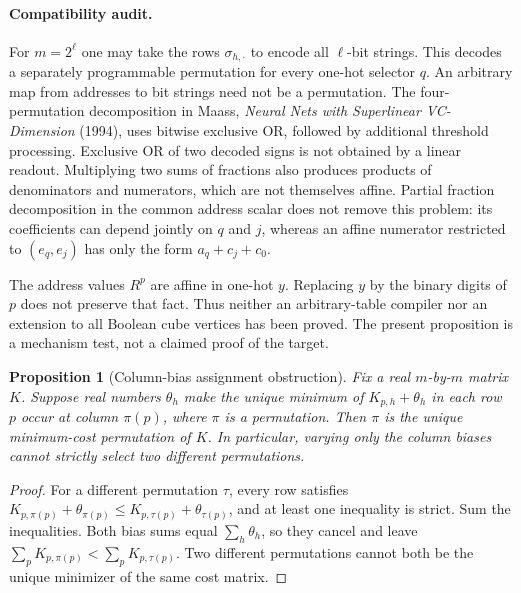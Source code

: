 \documentclass[11pt]{article}
\newtheorem{proposition}{Proposition}
\begin{document}
\paragraph{Compatibility audit.}
For $m=2^{\ell}$ one may take the rows $\sigma_{h,\cdot}$ to encode
all $\ell$-bit strings. This decodes a separately programmable
permutation for every one-hot selector $q$. An arbitrary map from
addresses to bit strings need not be a permutation. The four-permutation
decomposition in Maass, \emph{Neural Nets with Superlinear VC-Dimension}
(1994), uses bitwise exclusive OR, followed by additional threshold
processing. Exclusive OR of two decoded signs is not obtained by a
linear readout. Multiplying two sums of fractions also produces products
of denominators and numerators, which are not themselves affine.
Partial fraction decomposition in the common address scalar does not
remove this problem: its coefficients can depend jointly on $q$ and
$j$, whereas an affine numerator restricted to $(e_q,e_j)$ has only
the form $a_q+c_j+c_0$.

The address values $R^p$ are affine in one-hot $y$. Replacing $y$ by
the binary digits of $p$ does not preserve that fact. Thus neither an
arbitrary-table compiler nor an extension to all Boolean cube vertices
has been proved. The present proposition is a mechanism test, not a
claimed proof of the target.

\begin{proposition}[Column-bias assignment obstruction]
Fix a real $m$-by-$m$ matrix $K$. Suppose real numbers $\theta_h$
make the unique minimum of $K_{p,h}+\theta_h$ in each row $p$ occur
at column $\pi(p)$, where $\pi$ is a permutation. Then $\pi$ is the
unique minimum-cost permutation of $K$. In particular, varying only
the column biases cannot strictly select two different permutations.
\end{proposition}
\begin{proof}
For a different permutation $\tau$, every row satisfies
$K_{p,\pi(p)}+\theta_{\pi(p)}\le
K_{p,\tau(p)}+\theta_{\tau(p)}$, and at least one inequality is strict.
Sum the inequalities. Both bias sums equal $\sum_h\theta_h$, so they
cancel and leave
$\sum_pK_{p,\pi(p)}<\sum_pK_{p,\tau(p)}$.
Two different permutations cannot both be the unique minimizer of the
same cost matrix.
\end{proof}
\end{document}
